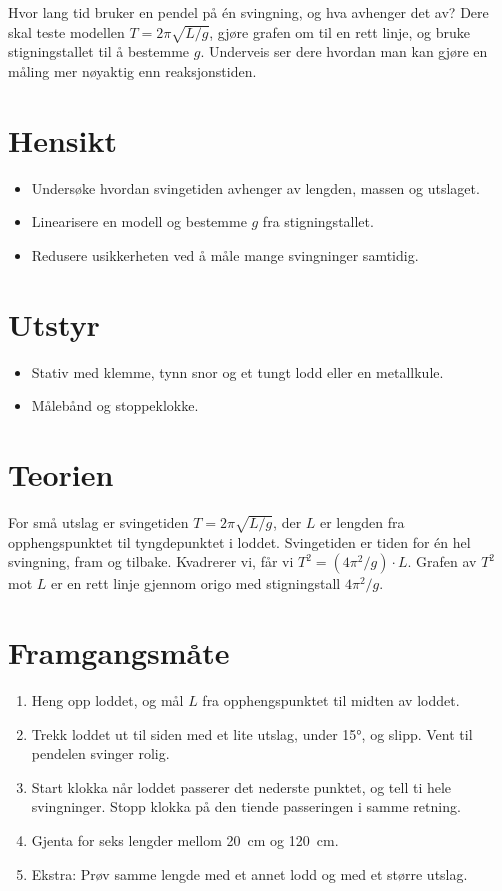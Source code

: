 \documentclass[11pt]{article}
\begin{document}

Hvor lang tid bruker en pendel på én svingning, og hva avhenger det av? Dere skal teste modellen $T = 2π\sqrt{L/g}$, gjøre grafen om til en rett linje, og bruke stigningstallet til å bestemme $g$. Underveis ser dere hvordan man kan gjøre en måling mer nøyaktig enn reaksjonstiden.

\section*{Hensikt}

\begin{itemize}
\item Undersøke hvordan svingetiden avhenger av lengden, massen og utslaget.
\item Linearisere en modell og bestemme $g$ fra stigningstallet.
\item Redusere usikkerheten ved å måle mange svingninger samtidig.
\end{itemize}

\section*{Utstyr}

\begin{itemize}
\item Stativ med klemme, tynn snor og et tungt lodd eller en metallkule.
\item Målebånd og stoppeklokke.
\end{itemize}

\section*{Teorien}

For små utslag er svingetiden $T = 2π\sqrt{L/g}$, der $L$ er lengden fra opphengspunktet til tyngdepunktet i loddet. Svingetiden er tiden for én hel svingning, fram og tilbake. Kvadrerer vi, får vi $T^{2} = (4π^{2}/g) \cdot L$. Grafen av $T^{2}$ mot $L$ er en rett linje gjennom origo med stigningstall $4π^{2}/g$.

\section*{Framgangsmåte}

\begin{enumerate}
\item Heng opp loddet, og mål $L$ fra opphengspunktet til midten av loddet.
\item Trekk loddet ut til siden med et lite utslag, under 15°, og slipp. Vent til pendelen svinger rolig.
\item Start klokka når loddet passerer det nederste punktet, og tell ti hele svingninger. Stopp klokka på den tiende passeringen i samme retning.
\item Gjenta for seks lengder mellom 20~cm og 120~cm.
\item Ekstra: Prøv samme lengde med et annet lodd og med et større utslag.
\end{enumerate}
\end{document}
